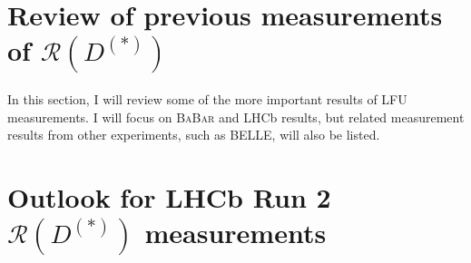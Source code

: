 \documentclass[12pt,letterpaper]{article}
\newcommand{\PRLrule}{
    \bigskip
    \noindent\makebox[\linewidth]{
        \resizebox{0.3333\linewidth}{1pt}{$\blacklozenge$}
    }
    \bigskip
}
\def\BaBar/{\textsc{BaBar}}
\def\RDDst/{\ensuremath{\mathcal{R}(D^{(*)})}}
\begin{document}
\section{Review of previous measurements of \RDDst/}
In this section, I will review some of the more important results of LFU
measurements.
I will focus on \BaBar/ and LHCb results, but related measurement results from
other experiments, such as BELLE, will also be listed.





\section{Outlook for LHCb Run 2 \RDDst/ measurements}


\PRLrule
\printbibliography
\end{document}
